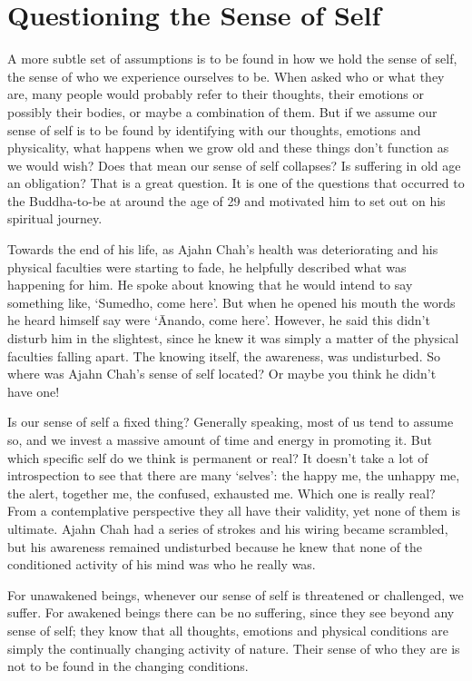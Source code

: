 \section{Questioning the Sense of Self}

A more subtle set of assumptions is to be found in how we hold the
sense of self, the sense of who we experience ourselves to be. When
asked who or what they are, many people would probably refer to their
thoughts, their emotions or possibly their bodies, or maybe a
combination of them. But if we assume our sense of self is to be found
by identifying with our thoughts, emotions and physicality, what happens
when we grow old and these things don’t function as we would wish? Does
that mean our sense of self collapses? Is suffering in old age an
obligation? That is a great question. It is one of the questions that
occurred to the Buddha-to-be at around the age of 29 and motivated him
to set out on his spiritual journey.

Towards the end of his life, as Ajahn Chah’s health was deteriorating
and his physical faculties were starting to fade, he helpfully described
what was happening for him. He spoke about knowing that he would intend
to say something like, ‘Sumedho, come here’. But when he opened his
mouth the words he heard himself say were ‘Ānando, come here’. However,
he said this didn’t disturb him in the slightest, since he knew it was
simply a matter of the physical faculties falling apart. The knowing
itself, the awareness, was undisturbed. So where was Ajahn Chah’s sense
of self located? Or maybe you think he didn’t have one!

Is our sense of self a fixed thing? Generally speaking, most of us tend
to assume so, and we invest a massive amount of time and energy in
promoting it. But which specific self do we think is permanent or real?
It doesn’t take a lot of introspection to see that there are many
‘selves’: the happy me, the unhappy me, the alert, together me, the
confused, exhausted me. Which one is really real? From a contemplative
perspective they all have their validity, yet none of them is ultimate.
Ajahn Chah had a series of strokes and his wiring became scrambled, but
his awareness remained undisturbed because he knew that none of the
conditioned activity of his mind was who he really was.

For unawakened beings, whenever our sense of self is threatened or
challenged, we suffer. For awakened beings there can be no suffering,
since they see beyond any sense of self; they know that all thoughts,
emotions and physical conditions are simply the continually changing
activity of nature. Their sense of who they are is not to be found in
the changing conditions.


